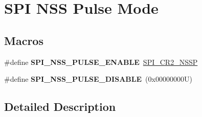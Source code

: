 \hypertarget{group___s_p_i___n_s_s_p___mode}{}\section{S\+PI N\+SS Pulse Mode}
\label{group___s_p_i___n_s_s_p___mode}
\subsection*{Macros}
\begin{DoxyCompactItemize}
\item 
\mbox{\label{group___s_p_i___n_s_s_p___mode_gac6243661f7fabde22ef936590f88be78}} 
\#define {\bfseries S\+P\+I\+\_\+\+N\+S\+S\+\_\+\+P\+U\+L\+S\+E\+\_\+\+E\+N\+A\+B\+LE}~\mbox{\hyperlink{group___peripheral___registers___bits___definition_ga2e7d9d05424a68e6b02b82280541dbd2}{S\+P\+I\+\_\+\+C\+R2\+\_\+\+N\+S\+SP}}
\item 
\mbox{\label{group___s_p_i___n_s_s_p___mode_ga34736b4ea038be7723b31a0416a26832}} 
\#define {\bfseries S\+P\+I\+\_\+\+N\+S\+S\+\_\+\+P\+U\+L\+S\+E\+\_\+\+D\+I\+S\+A\+B\+LE}~(0x00000000\+U)
\end{DoxyCompactItemize}


\subsection{Detailed Description}
